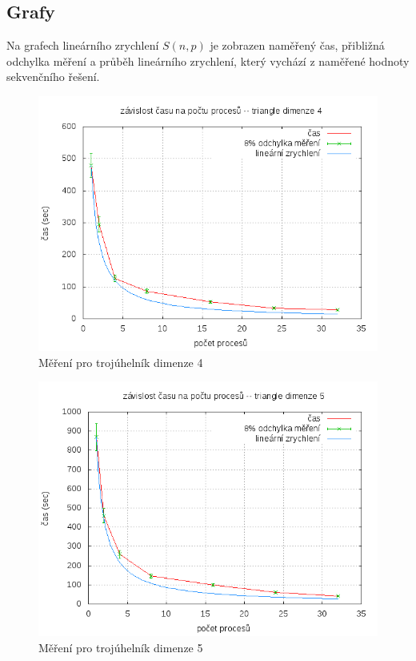 \documentclass[12pt,a4paper]{article}
\begin{document}
\clearpage
\subsection{Grafy}

Na grafech lineárního zrychlení $ S(n,p) $ je zobrazen naměřený čas, přibližná odchylka měření a průběh lineárního zrychlení, který vychází z naměřené hodnoty sekvenčního řešení.

\begin{figure}[h]
\includegraphics[width=\textwidth]{data4.png}
\caption{Měření pro trojúhelník dimenze 4}
\label{data4}
\end{figure}

\begin{figure}[h]
\includegraphics[width=\textwidth]{data5.png}
\caption{Měření pro trojúhelník dimenze 5}
\label{data5}
\end{figure}
\end{document}
